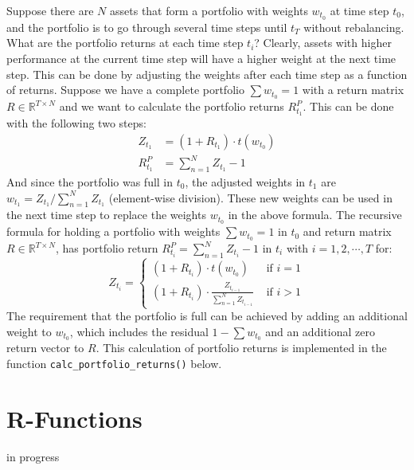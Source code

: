 \documentclass[
  oneside]{book}
\begin{document}
Suppose there are \(N\) assets that form a portfolio with weights \(w_{t_0}\) at time step \(t_0\), and the portfolio is to go through several time steps until \(t_T\) without rebalancing. What are the portfolio returns at each time step \(t_i\)? Clearly, assets with higher performance at the current time step will have a higher weight at the next time step. This can be done by adjusting the weights after each time step as a function of returns. Suppose we have a complete portfolio \(\textstyle\sum w_{t_0} = 1\) with a return matrix \(R \in \mathbb{R}^{T \times N}\) and we want to calculate the portfolio returns \(R_{t_1}^P\). This can be done with the following two steps:\\
\begin{align*}
  Z_{t_1} &= (1+R_{t_1}) \cdot t(w_{t_0})\\
  R_{t_1}^P &= \sum_{n = 1}^N Z_{t_1} - 1
\end{align*}
And since the portfolio was full in \(t_0\), the adjusted weights in \(t_1\) are \(w_{t_1} = Z_{t_1}/\sum_{n = 1}^N Z_{t_1}\) (element-wise division). These new weights can be used in the next time step to replace the weights \(w_{t_0}\) in the above formula. The recursive formula for holding a portfolio with weights \(\textstyle\sum w_{t_0} = 1\) in \(t_0\) and return matrix \(R \in \mathbb{R}^{T \times N}\), has portfolio return \(R_{t_i}^P = \textstyle\sum_{n = 1}^N Z_{t_i} - 1\) in \(t_i\) with \(i=1, 2, \cdots, T\) for:\\
\[
  Z_{t_i} =
  \begin{cases}
  (1+R_{t_i})\cdot t(w_{t_0}) &\text{ if }i=1\\
  (1+R_{t_i})\cdot \frac{Z_{t_{i-1}}}{\sum_{n = 1}^N Z_{t_{i-1}}} &\text{ if }i>1
  \end{cases}
\]
The requirement that the portfolio is full can be achieved by adding an additional weight to \(w_{t_0}\), which includes the residual \(1-\textstyle\sum w_{t_0}\) and an additional zero return vector to \(R\). This calculation of portfolio returns is implemented in the function \texttt{calc\_portfolio\_returns()} below.

\hypertarget{r-functions-2}{%
\section{R-Functions}\label{r-functions-2}}

\textbar\textbar\textbar in progress\textbar\textbar\textbar{}\\
\end{document}
